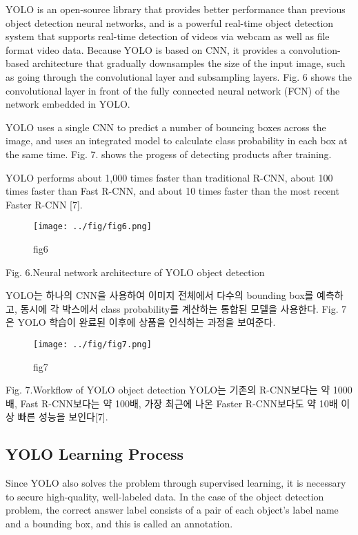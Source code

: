 \documentclass[smallextended]{svjour3}       %
\begin{document}
YOLO is an open-source library that provides better performance than
previous object detection neural networks, and is a powerful real-time
object detection system that supports real-time detection of videos via
webcam as well as file format video data. Because YOLO is based on CNN,
it provides a convolution-based architecture that gradually downsamples
the size of the input image, such as going through the convolutional
layer and subsampling layers. Fig. 6 shows the convolutional layer in
front of the fully connected neural network (FCN) of the network
embedded in YOLO.

YOLO uses a single CNN to predict a number of bouncing boxes across the
image, and uses an integrated model to calculate class probability in
each box at the same time. Fig. 7. shows the progess of detecting
products after training.

YOLO performs about 1,000 times faster than traditional R-CNN, about 100
times faster than Fast R-CNN, and about 10 times faster than the most
recent Faster R-CNN {[}7{]}.

\begin{figure}
\centering
\texttt{[image: ../fig/fig6.png]}
\caption{fig6}
\end{figure}

Fig. 6.Neural network architecture of YOLO object detection

YOLO는 하나의 CNN을 사용하여 이미지 전체에서 다수의 bounding box를
예측하고, 동시에 각 박스에서 class probability를 계산하는 통합된 모델을
사용한다. Fig. 7은 YOLO 학습이 완료된 이후에 상품을 인식하는 과정을
보여준다.

\begin{figure}
\centering
\texttt{[image: ../fig/fig7.png]}
\caption{fig7}
\end{figure}

Fig. 7.Workflow of YOLO object detection YOLO는 기존의 R-CNN보다는 약
1000배, Fast R-CNN보다는 약 100배, 가장 최근에 나온 Faster R-CNN보다도
약 10배 이상 빠른 성능을 보인다{[}7{]}.

\hypertarget{yolo-learning-process}{%
\subsection{YOLO Learning Process}\label{yolo-learning-process}}

Since YOLO also solves the problem through supervised learning, it is
necessary to secure high-quality, well-labeled data. In the case of the
object detection problem, the correct answer label consists of a pair of
each object's label name and a bounding box, and this is called an
annotation.
\end{document}
